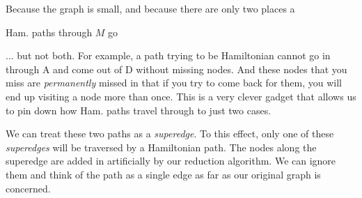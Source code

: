 

Because the graph is small, and because there are only two places 
a 

Ham. paths through $M$ go 

... but not both. For example, a path trying to be Hamiltonian 
cannot go in through A and come out of D without missing nodes. 
And these nodes that you miss are \textit{permanently} 
missed in that if you try to come back for them, you will end 
up visiting a node more than once. This is a very clever 
gadget that allows us to pin down how Ham. paths travel through to just 
two cases.

We can treat these two paths as a \textit{superedge}. 
To this effect, only one of these \textit{superedges} will be traversed 
by a Hamiltonian path. The nodes along the superedge are added in artificially 
by our reduction algorithm. We can ignore them and think of the path as a 
single edge as far as our original 
graph is concerned. 

\frmrule

